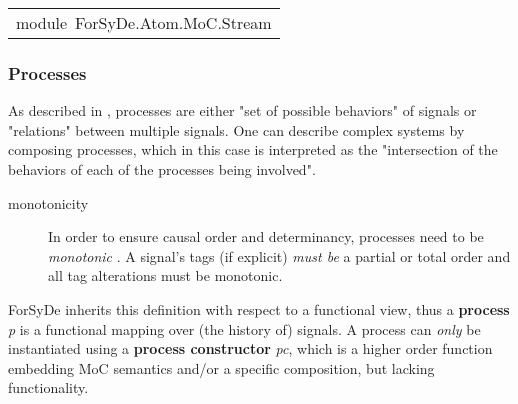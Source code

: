 \begin{haddockdesc}
\item[\begin{tabular}{@{}l}
module\ ForSyDe.Atom.MoC.Stream
\end{tabular}]
\end{haddockdesc}
\subsubsection{Processes}
As described in \cite{Lee98}, processes are either "set of
 possible behaviors" of signals or "relations" between multiple
 signals. One can describe complex systems by composing processes,
 which in this case is interpreted as the "intersection of the
 behaviors of each of the processes being involved".\par
\begin{description}
\item[monotonicity] In order to ensure causal order and determinancy,
 processes need to be \emph{monotonic} \cite{Lee98}. A signal's
 tags (if explicit) \emph{must be} a partial or total order and all tag
 alterations must be monotonic.
\end{description}ForSyDe inherits this definition with respect to a functional
 view, thus a \textbf{process} \emph{p} is a functional mapping over (the
 history of) signals. A process can \emph{only} be instantiated using a
 \textbf{process constructor} \emph{pc}, which is a higher order function
 embedding MoC semantics and/or a specific composition, but
 lacking functionality.\par
                 
